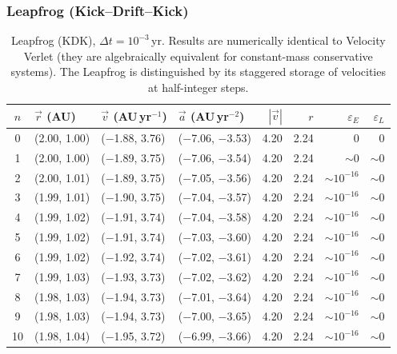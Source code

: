 \subsubsection*{Leapfrog (Kick--Drift--Kick)}

\begin{table}[H]
    \centering
    \scriptsize
    \setlength{\tabcolsep}{4pt}
    \begin{tabular}{c l l l r r r r}
        \hline
        $n$ & $\vec{r}$ (AU) & $\vec{v}$ (AU\,yr$^{-1}$) & $\vec{a}$ (AU\,yr$^{-2}$) & $|\vec{v}|$ & $r$ & $\varepsilon_E$ & $\varepsilon_L$ \\
        \hline
        0  & (2.00, 1.00) & ($-$1.88, 3.76)  & ($-$7.06, $-$3.53) & 4.20 & 2.24 & $0$ & $0$ \\
        1  & (2.00, 1.00) & ($-$1.89, 3.75)  & ($-$7.06, $-$3.54) & 4.20 & 2.24 & $\sim\!0$    & $\sim\!0$ \\
        2  & (2.00, 1.01) & ($-$1.89, 3.75)  & ($-$7.05, $-$3.56) & 4.20 & 2.24 & $\sim\!10^{-16}$ & $\sim\!0$ \\
        3  & (1.99, 1.01) & ($-$1.90, 3.75)  & ($-$7.04, $-$3.57) & 4.20 & 2.24 & $\sim\!10^{-16}$ & $\sim\!0$ \\
        4  & (1.99, 1.02) & ($-$1.91, 3.74)  & ($-$7.04, $-$3.58) & 4.20 & 2.24 & $\sim\!10^{-16}$ & $\sim\!0$ \\
        5  & (1.99, 1.02) & ($-$1.91, 3.74)  & ($-$7.03, $-$3.60) & 4.20 & 2.24 & $\sim\!10^{-16}$ & $\sim\!0$ \\
        6  & (1.99, 1.02) & ($-$1.92, 3.74)  & ($-$7.02, $-$3.61) & 4.20 & 2.24 & $\sim\!10^{-16}$ & $\sim\!0$ \\
        7  & (1.99, 1.03) & ($-$1.93, 3.73)  & ($-$7.02, $-$3.62) & 4.20 & 2.24 & $\sim\!10^{-16}$ & $\sim\!0$ \\
        8  & (1.98, 1.03) & ($-$1.94, 3.73)  & ($-$7.01, $-$3.64) & 4.20 & 2.24 & $\sim\!10^{-16}$ & $\sim\!0$ \\
        9  & (1.98, 1.03) & ($-$1.94, 3.73)  & ($-$7.00, $-$3.65) & 4.20 & 2.24 & $\sim\!10^{-16}$ & $\sim\!0$ \\
        10 & (1.98, 1.04) & ($-$1.95, 3.72)  & ($-$6.99, $-$3.66) & 4.20 & 2.24 & $\sim\!10^{-16}$ & $\sim\!0$ \\
        \hline
    \end{tabular}
    \caption{Leapfrog (KDK), $\Delta t = 10^{-3}$\,yr. Results are numerically identical to Velocity Verlet (they are algebraically equivalent for constant-mass conservative systems). The Leapfrog is distinguished by its staggered storage of velocities at half-integer steps.}
\end{table}

